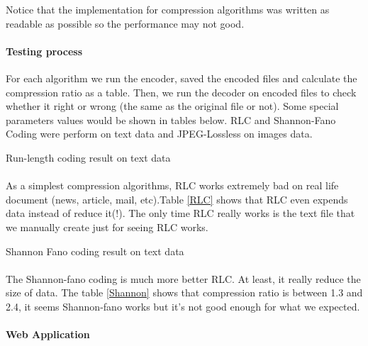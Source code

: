 Notice that the implementation for compression algorithms was written as readable as possible so the performance may not good.
\paragraph*{Testing process}
For each algorithm we run the encoder, saved the encoded files and calculate the compression ratio as a table. Then, we run the decoder on encoded files to check whether it right or wrong (the same as the original file or not). Some special parameters values would be shown in tables below. RLC and Shannon-Fano Coding were perform on text data and JPEG-Lossless on images data.
\begin{table}[h!]
\begin{center}
\caption{Run-length coding result on text data}
\label{RLC}
\end{center}
\end{table}
\paragraph*{}
As a simplest compression algorithms, RLC works extremely bad on real life document (news, article, mail, etc).Table \ref{RLC} shows that RLC even expends data instead of reduce it(!). The only time RLC really works is the text file that we manually create just for seeing RLC works.
\begin{table}[h!]
\begin{center}
\caption{Shannon Fano coding result on text data}
\label{Shannon}
\end{center}
\end{table}
\paragraph*{}
The Shannon-fano coding is much more better RLC. At least, it really reduce the size of data. The table \ref{Shannon} shows that compression ratio is between 1.3 and 2.4, it seems Shannon-fano works but it's not good enough for what we expected.
\paragraph*{Web Application}
